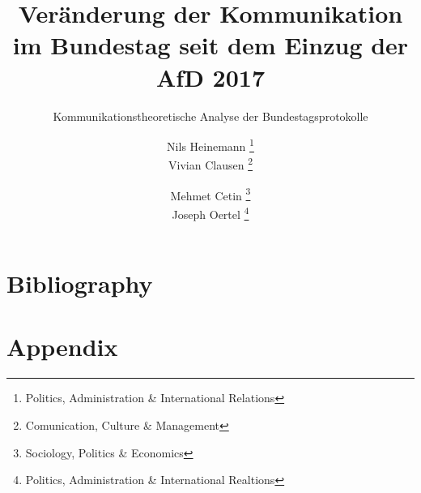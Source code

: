 \documentclass[12pt, letterpaper]{article}
\title{Veränderung der Kommunikation im Bundestag seit dem Einzug der AfD 2017}
\subtitle{Kommunikationstheoretische Analyse der Bundestagsprotokolle}
\author{Nils Heinemann \thanks{Politics, Administration \& International Relations}  \\[3ex] Vivian Clausen \thanks{Comunication, Culture \& Management} \and Mehmet Cetin \thanks{Sociology, Politics \& Economics} \\[3ex] Joseph Oertel \thanks{Politics, Administration \& International Realtions}\\[3ex]}
\begin{document}
	
	\maketitle
	\doublespacing
	

	
	\clearpage
	
	\newpage
	\tableofcontents
	
	
		
	
	
	
	
	
	\newpage
	
	\section{Bibliography}
	
	\newpage
	
	\section{Appendix}
	
	\listoftables
	\listoffigures
	
	
\end{document}
